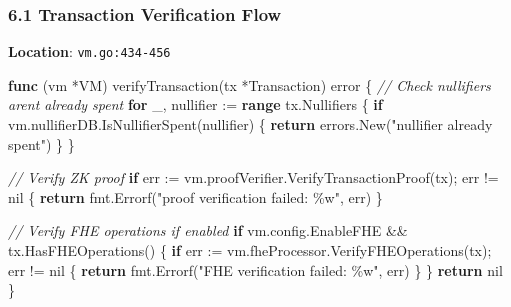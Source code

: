 \documentclass[
]{article}
\newenvironment{Shaded}{}{}
\newcommand{\CommentTok}[1]{\textcolor[rgb]{0.38,0.63,0.69}{\textit{#1}}}
\newcommand{\ControlFlowTok}[1]{\textcolor[rgb]{0.00,0.44,0.13}{\textbf{#1}}}
\newcommand{\DataTypeTok}[1]{\textcolor[rgb]{0.56,0.13,0.00}{#1}}
\newcommand{\KeywordTok}[1]{\textcolor[rgb]{0.00,0.44,0.13}{\textbf{#1}}}
\newcommand{\NormalTok}[1]{#1}
\newcommand{\OperatorTok}[1]{\textcolor[rgb]{0.40,0.40,0.40}{#1}}
\newcommand{\OtherTok}[1]{\textcolor[rgb]{0.00,0.44,0.13}{#1}}
\newcommand{\StringTok}[1]{\textcolor[rgb]{0.25,0.44,0.63}{#1}}
\begin{document}
\subsubsection{6.1 Transaction Verification
Flow}\label{61-transaction-verification-flow}

\textbf{Location}: \texttt{vm.go:434-456}

\begin{Shaded}
\begin{Highlighting}[]
\KeywordTok{func} \OperatorTok{(}\NormalTok{vm }\OperatorTok{*}\NormalTok{VM}\OperatorTok{)}\NormalTok{ verifyTransaction}\OperatorTok{(}\NormalTok{tx }\OperatorTok{*}\NormalTok{Transaction}\OperatorTok{)} \DataTypeTok{error} \OperatorTok{\{}
    \CommentTok{// Check nullifiers aren\textquotesingle{}t already spent}
    \ControlFlowTok{for}\NormalTok{ \_}\OperatorTok{,}\NormalTok{ nullifier }\OperatorTok{:=} \KeywordTok{range}\NormalTok{ tx}\OperatorTok{.}\NormalTok{Nullifiers }\OperatorTok{\{}
        \ControlFlowTok{if}\NormalTok{ vm}\OperatorTok{.}\NormalTok{nullifierDB}\OperatorTok{.}\NormalTok{IsNullifierSpent}\OperatorTok{(}\NormalTok{nullifier}\OperatorTok{)} \OperatorTok{\{}
            \ControlFlowTok{return}\NormalTok{ errors}\OperatorTok{.}\NormalTok{New}\OperatorTok{(}\StringTok{"nullifier already spent"}\OperatorTok{)}
        \OperatorTok{\}}
    \OperatorTok{\}}
    
    \CommentTok{// Verify ZK proof}
    \ControlFlowTok{if}\NormalTok{ err }\OperatorTok{:=}\NormalTok{ vm}\OperatorTok{.}\NormalTok{proofVerifier}\OperatorTok{.}\NormalTok{VerifyTransactionProof}\OperatorTok{(}\NormalTok{tx}\OperatorTok{);}\NormalTok{ err }\OperatorTok{!=} \OtherTok{nil} \OperatorTok{\{}
        \ControlFlowTok{return}\NormalTok{ fmt}\OperatorTok{.}\NormalTok{Errorf}\OperatorTok{(}\StringTok{"proof verification failed: \%w"}\OperatorTok{,}\NormalTok{ err}\OperatorTok{)}
    \OperatorTok{\}}
    
    \CommentTok{// Verify FHE operations if enabled}
    \ControlFlowTok{if}\NormalTok{ vm}\OperatorTok{.}\NormalTok{config}\OperatorTok{.}\NormalTok{EnableFHE }\OperatorTok{\&\&}\NormalTok{ tx}\OperatorTok{.}\NormalTok{HasFHEOperations}\OperatorTok{()} \OperatorTok{\{}
        \ControlFlowTok{if}\NormalTok{ err }\OperatorTok{:=}\NormalTok{ vm}\OperatorTok{.}\NormalTok{fheProcessor}\OperatorTok{.}\NormalTok{VerifyFHEOperations}\OperatorTok{(}\NormalTok{tx}\OperatorTok{);}\NormalTok{ err }\OperatorTok{!=} \OtherTok{nil} \OperatorTok{\{}
            \ControlFlowTok{return}\NormalTok{ fmt}\OperatorTok{.}\NormalTok{Errorf}\OperatorTok{(}\StringTok{"FHE verification failed: \%w"}\OperatorTok{,}\NormalTok{ err}\OperatorTok{)}
        \OperatorTok{\}}
    \OperatorTok{\}}
    \ControlFlowTok{return} \OtherTok{nil}
\OperatorTok{\}}
\end{Highlighting}
\end{Shaded}
\end{document}
